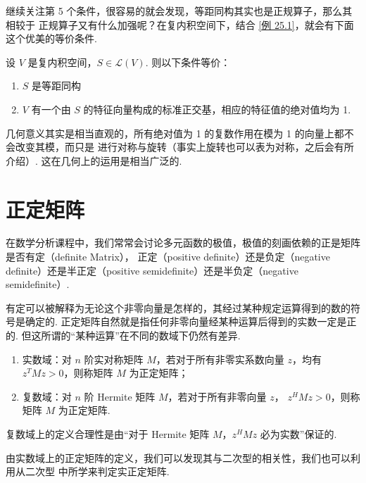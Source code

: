 继续关注第 5 个条件，很容易的就会发现，等距同构其实也是正规算子，那么其相较于
正规算子又有什么加强呢？在复内积空间下，结合 \ref{例 25.1}，就会有下面这个优美的等价条件. 

\begin{theorem}
    设 $ V $ 是复内积空间，$ S \in \mathcal{L}(V) $. 则以下条件等价：
    \begin{enumerate}
        \item $ S $ 是等距同构
        
        \item $ V $ 有一个由 $ S $ 的特征向量构成的标准正交基，相应的特征值的绝对值均为 1. 
    \end{enumerate}
\end{theorem}

几何意义其实是相当直观的，所有绝对值为 1 的复数作用在模为 1 的向量上都不会改变其模，而只是
进行对称与旋转（事实上旋转也可以表为对称，之后会有所介绍）. 这在几何上的运用是相当广泛的.  

\section{正定矩阵}

在数学分析课程中，我们常常会讨论多元函数的极值，极值的刻画依赖的正是矩阵是否有定（definite Matrix），
正定（positive definite）还是负定（negative definite）还是半正定（positive semidefinite）还是半负定（negative semidefinite）. 

有定可以被解释为无论这个非零向量是怎样的，其经过某种规定运算得到的数的符号是确定的. 
正定矩阵自然就是指任何非零向量经某种运算后得到的实数一定是正的. 
但这所谓的“某种运算”在不同的数域下仍然有差异. 

\begin{definition} 
    \begin{enumerate}
        \item 实数域：对 $ n $ 阶实对称矩阵 $ M $，若对于所有非零实系数向量 $ z $，均有
        $ z^{T}Mz > 0 $，则称矩阵 $ M $ 为正定矩阵；
        
        \item 复数域：对 $ n $ 阶 Hermite 矩阵 $ M $，若对于所有非零向量 $ z $，
        $ z^{H}Mz > 0 $，则称矩阵 $ M $ 为正定矩阵. 
    \end{enumerate}
\end{definition}

复数域上的定义合理性是由“对于 Hermite 矩阵 $ M $，$ z^{H}Mz $ 必为实数”保证的. 

由实数域上的正定矩阵的定义，我们可以发现其与二次型的相关性，我们也可以利用从二次型
中所学来判定实正定矩阵. 

